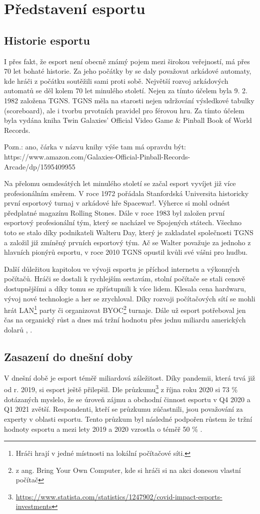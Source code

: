 \chapter{Představení esportu}
\section{Historie esportu}
I přes fakt, že esport není obecně známý pojem mezi širokou veřejností, má přes 70 let bohaté historie. Za jeho počátky by se
daly považovat arkádové automaty, kde hráči z počátku soutěžili sami proti sobě. Největší rozvoj arkádových automatů se děl kolem 70 let minulého 
století. Nejen za tímto účelem byla 9. 2. 1982 založena \ac{TGNS}. \ac{TGNS} měla na starosti nejen udržování výsledkové tabulky (scoreboard),
ale i tvorbu prvotních pravidel pro férovou hru. Za tímto účelem byla vydána kniha Twin Galaxies' Official Video Game \& Pinball Book of World Records.

{\color{green}
Pozn.: ano, čárka v názvu knihy výše tam má opravdu být: https://www.amazon.com/Galaxies-Official-Pinball-Records-Arcade/dp/1595409955
}


Na přelomu osmdesátých let minulého století se začal esport vyvíjet již více profesionálním směrem. V roce 1972 pořádala Stanfordská Universita historicky první
esportový turnaj v arkádové hře Spacewar!. Výherce si mohl odnést předplatné magazínu Rolling Stones. Dále v roce 1983 byl založen první esportový profesionální tým,
který se nacházel ve Spojených státech. Všechno toto se stalo díky podnikateli Walteru Day, který je zakladatel společnosti \ac{TGNS} a založil již zmíněný
prvních esportový tým. Ač se Walter považuje za jednoho z hlavních pionýrů esportu, v roce 2010 \ac{TGNS} opustil kvůli své vášni pro hudbu.

Další důležitou kapitolou ve vývoji esportu je příchod internetu a výkonných počítačů. Hráči se dostali k rychlejším sestavám, stolní počítače se stali cenově dostupnějšími a díky tomu
se zpřístupnili k více lidem. Klesala cena hardwaru, vývoj nové technologie a her se zrychloval. Díky rozvoji počítačových sítí se mohli hrát LAN\footnote{Hráči hrají v jedné
místnosti na lokální počítačové síti.} party či organizovat BYOC\footnote{z ang. Bring Your Own Computer, kde si hráči si na akci donesou vlastní počítač} turnaje. Dále už esport 
potřeboval jen čas na organický růst a dnes má tržní hodnotu přes jednu miliardu amerických dolarů \cite{Gough2021}, \cite{Larch2019}.

\section{Zasazení do dnešní doby}
V dnešní době je esport téměř miliardová záležitost. Díky pandemii, 
{\color{red}
která trvá již od r. 2019,
}
si esport ještě přilepšil.
Dle průzkumu\footnote{\url{https://www.statista.com/statistics/1247902/covid-impact-esports-investments}}
z října roku 2020 si 73 \% dotázaných myslelo, že se úroveň zájmu a obchodní činnost esportu v Q4 2020 a Q1 2021
zvětší. Respondenti, kteří se průzkumu zúčastnili, jsou považování za experty v oblasti esportu. Tento průzkum byl následné podpořen růstem že tržní hodnoty
esportu a mezi lety 2019 a 2020 vzrostla o téměř 50 \% \cite{Gough2021}.

